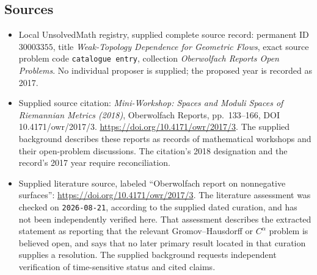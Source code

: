 \documentclass[11pt]{article}
\begin{document}
\subsection{Sources}
\begin{itemize}
\item Local UnsolvedMath registry, supplied complete source record: permanent ID \(30003355\), title \emph{Weak-Topology Dependence for Geometric Flows}, exact source problem code \texttt{catalogue entry}, collection \emph{Oberwolfach Reports Open Problems}. No individual proposer is supplied; the proposed year is recorded as 2017.
\item Supplied source citation: \emph{Mini-Workshop: Spaces and Moduli Spaces of Riemannian Metrics (2018)}, Oberwolfach Reports, pp.\ 133--166, DOI 10.4171/owr/2017/3. \url{https://doi.org/10.4171/owr/2017/3}. The supplied background describes these reports as records of mathematical workshops and their open-problem discussions. The citation's 2018 designation and the record's 2017 year require reconciliation.
\item Supplied literature source, labeled ``Oberwolfach report on nonnegative surfaces'': \url{https://doi.org/10.4171/owr/2017/3}. The literature assessment was checked on \texttt{2026-08-21}, according to the supplied dated curation, and has not been independently verified here. That assessment describes the extracted statement as reporting that the relevant Gromov--Hausdorff or \(C^{\alpha}\) problem is believed open, and says that no later primary result located in that curation supplies a resolution. The supplied background requests independent verification of time-sensitive status and cited claims.
\end{itemize}
\end{document}
